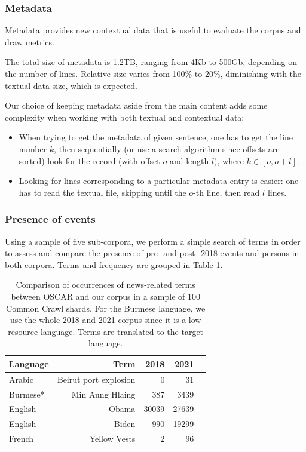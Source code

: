 \subsubsection{Metadata}

Metadata provides new contextual data that is useful to evaluate the corpus and draw metrics.

The total size of metadata is 1.2TB, ranging from 4Kb to 500Gb, depending on the number of lines. Relative size varies from 100\% to 20\%, diminishing with the textual data size, which is expected.

Our choice of keeping metadata aside from the main content adds some complexity when working with both textual and contextual data:

\begin{itemize}
    \item When trying to get the metadata of given sentence, one has to get the line number $k$, then sequentially (or use a search algorithm since offsets are sorted) look for the record (with offset $o$ and length $l$), where $k \in [o, o+l]$.
    \item Looking for lines corresponding to a particular metadata entry is easier: one has to read the textual file, skipping until the $o$-th line, then read $l$ lines.
\end{itemize}


\subsubsection{Presence of events}

Using a sample of five sub-corpora, we perform a simple search of terms in order to assess and compare the presence of pre- and post- 2018 events and persons in both corpora. Terms and frequency are grouped in Table \ref{tab:word-frequency}.

\begin{table}[t]
    \centering\small
    \begin{tabular}{lrrrr}
        \toprule
        Language                  & Term                  & 2018  & 2021  \\
        \midrule
        \multirow{1}{*}{Arabic}   & Beirut port explosion & 0     & 31    \\
        \multirow{1}{*}{Burmese*} & Min Aung Hlaing       & 387   & 3439  \\
        \multirow{1}{*}{English}  & Obama                 & 30039 & 27639 \\
        \multirow{1}{*}{English}  & Biden                 & 990   & 19299 \\
        \multirow{1}{*}{French}   & Yellow Vests          & 2     & 96    \\
        \bottomrule
    \end{tabular}
    \caption{Comparison of occurrences of news-related terms between OSCAR and our corpus in a sample of 100 Common Crawl shards. For the Burmese language, we use the whole 2018 and 2021 corpus since it is a low resource language. Terms are translated to the target language.}
    \label{tab:word-frequency}
\end{table}


